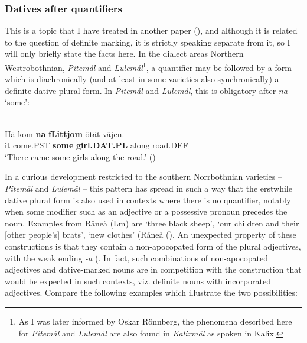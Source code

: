 \z

\subsubsection{Datives after quantifiers}
This is a topic that I have treated in another paper (\citet{Dahl2008}), and although it is related to the question of definite marking, it is strictly speaking separate from it, so I will only briefly state the facts here. In the dialect areas Northern Westrobothnian, \textit{Pitemål} and \textit{Lulemål}\footnote{ As I was later informed by Oskar Rönnberg, the phenomena described here for \textit{Pitemål} and \textit{Lulemål} are also found in \textit{Kalixmål}\textit{ }as spoken in Kalix.}, a quantifier may be followed by a form which is diachronically (and at least in some varieties also synchronically) a definite dative plural form. In \textit{Pitemål} and \textit{Lulemål}, this is obligatory after \textit{na} ‘some’:

\ea \label{} 
\\
\gll Hä  kom  \textbf{na} \textbf{  fLi{\textasciigrave}ttjom} ötät  väjen.\\
it  come.PST  \textbf{some} \textbf{girl.DAT.PL} along  road.DEF\\
\glt ‘There came some girls along the road.’ (\citet[19]{Brännström1993}) 

\z

In a curious development restricted to the southern Norrbothnian varieties –  \textit{Pitemål} and \textit{Lulemål} – this pattern has spread in such a way that the erstwhile dative plural form is also used in contexts where there is no quantifier, notably when some modifier such as an adjective or a possessive pronoun precedes the noun. Examples from Råneå (Lm) are  ‘three black sheep’,  ‘our children and their [other people’s] brats’,  ‘new clothes’ (Råneå (\citet{Wikberg2004}). An unexpected property of these constructions is that they contain a non-apocopated form of the plural adjectives, with the weak ending\textit{ {}-a }(\citet[36]{Dahlstedt1956}. In fact, such combinations of non-apocopated adjectives and dative-marked nouns are in competition with the construction that would be expected in such contexts, viz. definite nouns with incorporated adjectives. Compare the following examples which illustrate the two possibilities:

